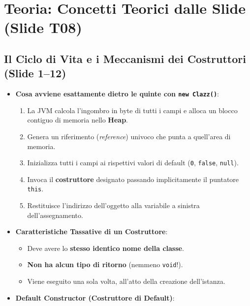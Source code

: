 \documentclass[11pt,a4paper,oneside]{report}
\newcommand{\passthrough}[1]{#1}
\providecommand{\tightlist}{\setlength{\itemsep}{0pt}\setlength{\parskip}{0pt}}
\begin{document}
\section{Teoria: Concetti Teorici dalle Slide (Slide
T08)}\label{chap07_teoria-concetti-teorici-dalle-slide-slide-t08}

\subsection{Il Ciclo di Vita e i Meccanismi dei Costruttori (Slide
1--12)}\label{chap07_il-ciclo-di-vita-e-i-meccanismi-dei-costruttori-slide-112}

\begin{itemize}
\tightlist
\item
  \textbf{Cosa avviene esattamente dietro le quinte con
  \passthrough{\lstinline!new Clazz()!}}:

  \begin{enumerate}
  \def\labelenumi{\arabic{enumi}.}
  \tightlist
  \item
    La JVM calcola l'ingombro in byte di tutti i campi e alloca un
    blocco contiguo di memoria nello \textbf{Heap}.
  \item
    Genera un riferimento (\emph{reference}) univoco che punta a
    quell'area di memoria.
  \item
    Inizializza tutti i campi ai rispettivi valori di default
    (\passthrough{\lstinline!0!}, \passthrough{\lstinline!false!},
    \passthrough{\lstinline!null!}).
  \item
    Invoca il \textbf{costruttore} designato passando implicitamente il
    puntatore \passthrough{\lstinline!this!}.
  \item
    Restituisce l'indirizzo dell'oggetto alla variabile a sinistra
    dell'assegnamento.
  \end{enumerate}
\item
  \textbf{Caratteristiche Tassative di un Costruttore}:

  \begin{itemize}
  \tightlist
  \item
    Deve avere lo \textbf{stesso identico nome della classe}.
  \item
    \textbf{Non ha alcun tipo di ritorno} (nemmeno
    \passthrough{\lstinline!void!}!).
  \item
    Viene eseguito una sola volta, all'atto della creazione
    dell'istanza.
  \end{itemize}
\item
  \textbf{Default Constructor (Costruttore di Default)}:


\end{itemize}
\end{document}
